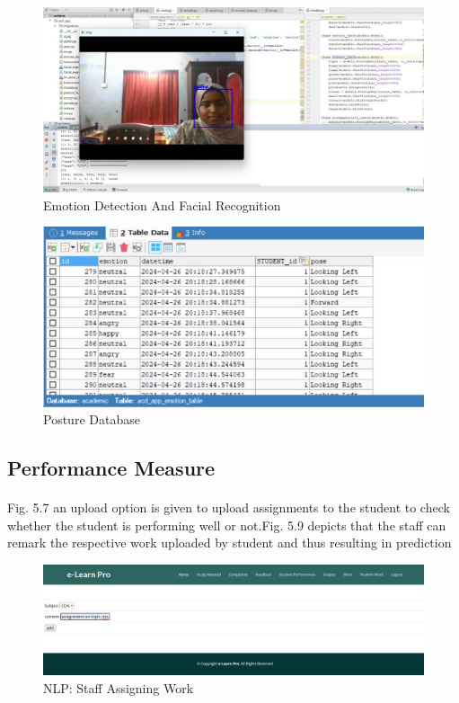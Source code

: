\begin{figure}[!ht]
\centering
\includegraphics[width=125mm]{emotion detection and facial recognition.png}
\caption{Emotion Detection And Facial Recognition}
\end{figure} 


\begin{figure}[!ht]
\centering
\includegraphics[width=125mm]{post database.png}
\caption{Posture Database}
\end{figure} 

\subsection{Performance Measure}

\paragraph{} Fig. 5.7 an upload option is given to upload assignments to the student to check whether the student is performing well or not.Fig. 5.9 depicts that the staff can remark the respective work uploaded by student and thus resulting in prediction
\begin{figure}[!ht]
\centering
\includegraphics[width=125mm]{staff assigning wo.png}
\caption{NLP: Staff Assigning Work}
\end{figure} 

